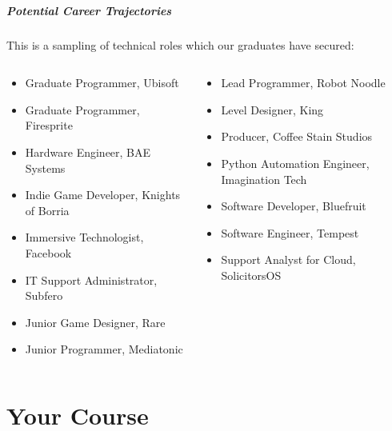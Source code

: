 \begin{frame}
	\frametitle{Potential Career Trajectories}
	
	This is a sampling of technical roles which our graduates have secured:
	
	\begin{columns}
		\begin{column}{0.5\textwidth}
			\begin{itemize}
				\item Graduate Programmer, Ubisoft
				\item Graduate Programmer, Firesprite
				\item Hardware Engineer, BAE Systems
				\item Indie Game Developer, Knights of Borria
				\item Immersive Technologist, Facebook
				\item IT Support Administrator, Subfero
				\item Junior Game Designer, Rare
				\item Junior Programmer, Mediatonic
			\end{itemize}
		\end{column}
		\begin{column}{0.5\textwidth}
			\begin{itemize}
				\item Lead Programmer, Robot Noodle
				\item Level Designer, King
				\item Producer, Coffee Stain Studios
				\item Python Automation Engineer, Imagination Tech
				\item Software Developer, Bluefruit
				\item Software Engineer, Tempest
				\item Support Analyst for Cloud, SolicitorsOS
			\end{itemize}
		\end{column}
	\end{columns}
\end{frame}

\fontsize{11pt}{7.2}\selectfont


\part{Your Course}
\frame{\partpage}

